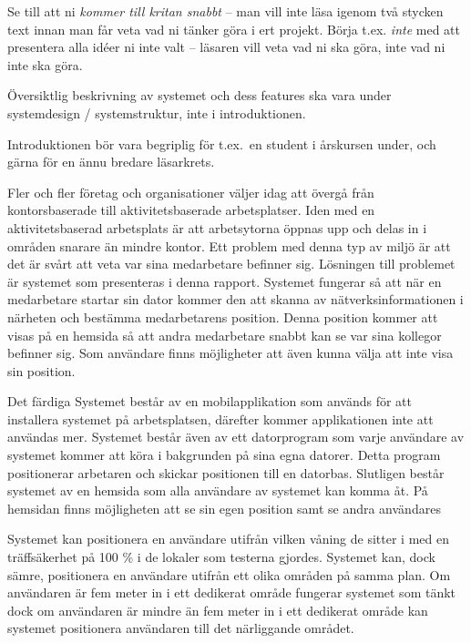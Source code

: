 \documentclass[swedish, a4paper,12pt]{article}
\begin{document}
Se till att ni \emph{kommer till kritan snabbt} – man vill inte läsa igenom två stycken text innan man får veta vad ni tänker göra i ert projekt.  Börja t.ex. \emph{inte} med att presentera alla idéer ni inte valt – läsaren vill veta vad ni ska göra, inte vad ni inte ska göra.

Översiktlig beskrivning av systemet och dess features ska vara under systemdesign / systemstruktur, inte i introduktionen.

Introduktionen bör vara begriplig för t.ex.~en student i årskursen under, och gärna för en ännu bredare läsarkrets.
\fi

Fler och fler företag och organisationer väljer idag att övergå från kontorsbaserade till aktivitetsbaserade arbetsplatser. Iden med en aktivitetsbaserad arbetsplats är att arbetsytorna öppnas upp och delas in i områden snarare än mindre kontor. Ett problem med denna typ av miljö är att det är svårt att veta var sina medarbetare befinner sig. Lösningen till problemet är systemet som presenteras i denna rapport. Systemet fungerar så att när en medarbetare startar sin dator kommer den att skanna av nätverksinformationen i närheten och bestämma medarbetarens position. Denna position kommer att visas på en hemsida så att andra medarbetare snabbt kan se var sina kollegor befinner sig. Som användare finns möjligheter att även kunna välja att inte visa sin position.

Det färdiga Systemet består av en mobilapplikation som används för att installera systemet på arbetsplatsen, därefter kommer applikationen inte att användas mer. Systemet består även av ett datorprogram som varje användare av systemet kommer att köra i bakgrunden på sina egna datorer. Detta program positionerar arbetaren och skickar positionen till en datorbas. Slutligen består systemet av en hemsida som alla användare av systemet kan komma åt. På hemsidan finns möjligheten att se sin egen position samt se andra användares %

Systemet kan positionera en användare utifrån vilken våning de sitter i med en träffsäkerhet på 100 \% i de lokaler som testerna gjordes. Systemet kan, dock sämre, positionera en användare utifrån ett olika områden på samma plan. Om användaren är fem meter in i ett dedikerat område fungerar systemet som tänkt dock om användaren är mindre än fem meter in i ett dedikerat område kan systemet positionera användaren till det närliggande området.
\end{document}

